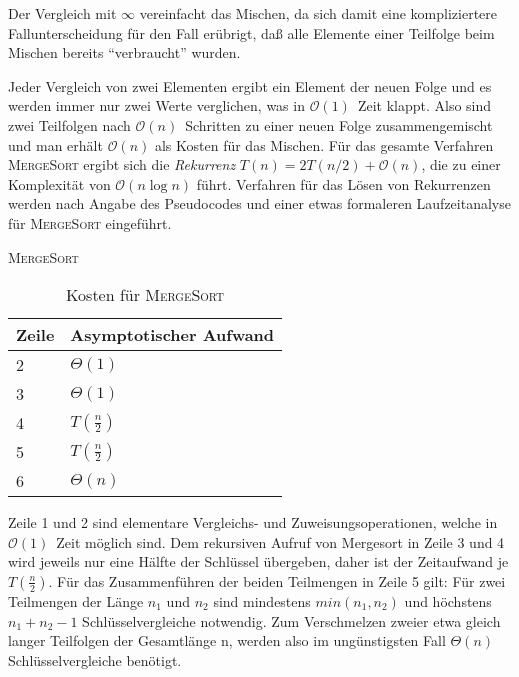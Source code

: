 \documentclass[ngerman,draft,parskip=half*,twoside]{scrreprt}
\theoremstyle{break}
\theoremstyle{nonumberbreak}
\newcommand*{\OO}{\mathcal{O}}      %
\begin{document}
Der Vergleich mit $\infty$ vereinfacht das Mischen, da sich damit eine kompliziertere Fallunterscheidung für den Fall erübrigt, 
daß alle Elemente einer Teilfolge beim Mischen bereits "`verbraucht"' wurden.

Jeder Vergleich von zwei Elementen ergibt ein Element der neuen Folge und es werden immer nur zwei Werte verglichen, was in
$\OO(1)$~Zeit klappt. Also sind zwei Teilfolgen nach $\OO(n)$~Schritten zu einer neuen Folge zusammengemischt und man erhält
$\OO(n)$ als Kosten für das Mischen.
Für das gesamte Verfahren \textsc{MergeSort} ergibt sich die \textit{Rekurrenz} $T(n)=2T(n/2)+\OO(n)$, die zu einer Komplexität von $\OO(n
\log n)$ führt. Verfahren für das Lösen von Rekurrenzen werden nach Angabe des Pseudocodes und einer etwas
formaleren Laufzeitanalyse für \textsc{MergeSort} eingeführt.

%
\begin{algorithm}
  \caption{\textsc{MergeSort}}
\end{algorithm}

\begin{table}[h]
  \begin{tabular}{*{2}{l}}
    Zeile & Asymptotischer Aufwand\\
    \hline
    2 & $\Theta(1)$\\
    3 & $\Theta(1)$\\
    4 & $T(\frac{n}{2})$\\
    5 & $T(\frac{n}{2})$\\
    6 & $\Theta(n)$\\
  \end{tabular}
  \caption{Kosten für \textsc{MergeSort}} 
\end{table}

Zeile 1 und 2 sind elementare Vergleichs- und Zuweisungsoperationen, welche in $\OO(1)$~Zeit möglich sind. 
Dem rekursiven Aufruf von Mergesort in Zeile 3 und 4 wird jeweils nur eine Hälfte der Schlüssel übergeben, 
daher ist der Zeitaufwand je $T(\frac{n}{2})$. Für das Zusammenführen der beiden Teilmengen in Zeile 5 gilt: 
Für zwei Teilmengen der Länge $n_1$ und $n_2$ sind mindestens $min(n_1,n_2)$ und höchstens $n_1 + n_2 -1$ Schlüsselvergleiche notwendig. 
Zum Verschmelzen zweier etwa gleich langer Teilfolgen der Gesamtlänge n, werden also im ungünstigsten Fall $\Theta(n)$ Schlüsselvergleiche benötigt.
\end{document}

